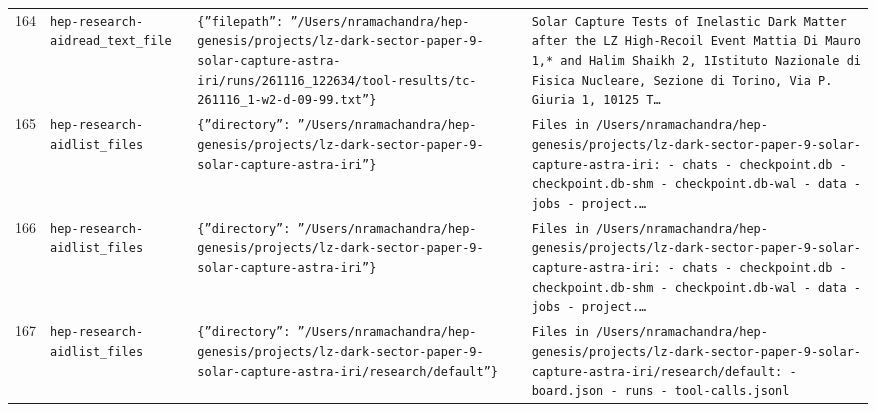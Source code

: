 \documentclass[11pt,a4paper]{article}
\begin{document}
\begin{longtable}{@{}p{}p{}p{}p{}@{}}
164 & \texttt{hep-research-aid}\newline\texttt{read\_\allowbreak{}text\_\allowbreak{}file} & \texttt{\{''filepath'':\allowbreak{} ''/\allowbreak{}Users/\allowbreak{}nramachandra/\allowbreak{}hep-genesis/\allowbreak{}projects/\allowbreak{}lz-dark-sector-paper-9-solar-capture-astra-iri/\allowbreak{}runs/\allowbreak{}261116\_\allowbreak{}122634/\allowbreak{}tool-results/\allowbreak{}tc-261116\_\allowbreak{}1-w2-d-09-99.txt''\}\allowbreak{}} & \texttt{Solar Capture Tests of Inelastic Dark Matter after the LZ High-Recoil Event Mattia Di Mauro 1,\allowbreak{}* and Halim Shaikh 2,\allowbreak{}\dag{}\allowbreak{} 1Istituto Nazionale di Fisica Nucleare,\allowbreak{} Sezione di Torino,\allowbreak{} Via P. Giuria 1,\allowbreak{} 10125 T\ldots{}\allowbreak{}} \\
165 & \texttt{hep-research-aid}\newline\texttt{list\_\allowbreak{}files} & \texttt{\{''directory'':\allowbreak{} ''/\allowbreak{}Users/\allowbreak{}nramachandra/\allowbreak{}hep-genesis/\allowbreak{}projects/\allowbreak{}lz-dark-sector-paper-9-solar-capture-astra-iri''\}\allowbreak{}} & \texttt{Files in /\allowbreak{}Users/\allowbreak{}nramachandra/\allowbreak{}hep-genesis/\allowbreak{}projects/\allowbreak{}lz-dark-sector-paper-9-solar-capture-astra-iri:\allowbreak{}   - chats   - checkpoint.db   - checkpoint.db-shm   - checkpoint.db-wal   - data   - jobs   - project.\ldots{}\allowbreak{}} \\
166 & \texttt{hep-research-aid}\newline\texttt{list\_\allowbreak{}files} & \texttt{\{''directory'':\allowbreak{} ''/\allowbreak{}Users/\allowbreak{}nramachandra/\allowbreak{}hep-genesis/\allowbreak{}projects/\allowbreak{}lz-dark-sector-paper-9-solar-capture-astra-iri''\}\allowbreak{}} & \texttt{Files in /\allowbreak{}Users/\allowbreak{}nramachandra/\allowbreak{}hep-genesis/\allowbreak{}projects/\allowbreak{}lz-dark-sector-paper-9-solar-capture-astra-iri:\allowbreak{}   - chats   - checkpoint.db   - checkpoint.db-shm   - checkpoint.db-wal   - data   - jobs   - project.\ldots{}\allowbreak{}} \\
167 & \texttt{hep-research-aid}\newline\texttt{list\_\allowbreak{}files} & \texttt{\{''directory'':\allowbreak{} ''/\allowbreak{}Users/\allowbreak{}nramachandra/\allowbreak{}hep-genesis/\allowbreak{}projects/\allowbreak{}lz-dark-sector-paper-9-solar-capture-astra-iri/\allowbreak{}research/\allowbreak{}default''\}\allowbreak{}} & \texttt{Files in /\allowbreak{}Users/\allowbreak{}nramachandra/\allowbreak{}hep-genesis/\allowbreak{}projects/\allowbreak{}lz-dark-sector-paper-9-solar-capture-astra-iri/\allowbreak{}research/\allowbreak{}default:\allowbreak{}   - board.json   - runs   - tool-calls.jsonl} \\

\end{longtable}
\end{document}
